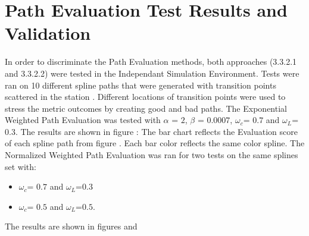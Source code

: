 \section{Path Evaluation Test Results and Validation}
In order to discriminate the Path Evaluation methods,
both approaches (3.3.2.1 and 3.3.2.2) were tested in the Independant Simulation Environment. 
Tests were ran on 10 different spline paths  that were generated with transition points scattered in 
the station .
Different locations of transition points were used to stress the metric outcomes by creating good and bad paths. 
The Exponential Weighted Path Evaluation was tested with \(\alpha\) = \(2\), \(\beta\) = \(0.0007\), 
\(\omega_c\)= \(0.7\) and \(\omega_L\)=\(0.3\).
The results are shown in figure : The bar chart reflects the Evaluation score of each 
spline path from figure . Each bar color reflects the same color spline.
The Normalized Weighted Path Evaluation was ran for two tests on the same splines set with:
\begin{itemize}
    \item \(\omega_c\)= \(0.7\) and \(\omega_L\)=\(0.3\)
    \item \(\omega_c\)= \(0.5\) and \(\omega_L\)=\(0.5\). 
\end{itemize}
 
The results are shown in figures  and 

